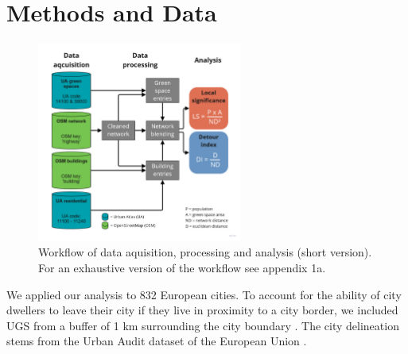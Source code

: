 \documentclass[10pt]{article}
\begin{document}
\section{Methods and Data}
\begin{figure}[t!]
\centering
\includegraphics[width=0.6\textwidth]{2-2_md-flowchart.pdf}
\caption{Workflow of data aquisition, processing and analysis (short version). For an exhaustive version of the workflow see appendix 1a.}
\label{fig:flowchart}
\end{figure}

We applied our analysis to 832 European cities.
To account for the ability of city dwellers to leave their city if they live in proximity to a city border, we included UGS from a buffer of 1 km surrounding the city boundary \citep{Wolff.2020}.
The city delineation stems from the Urban Audit dataset of the European Union \citep{UrbanAudit.2022}.
\end{document}
